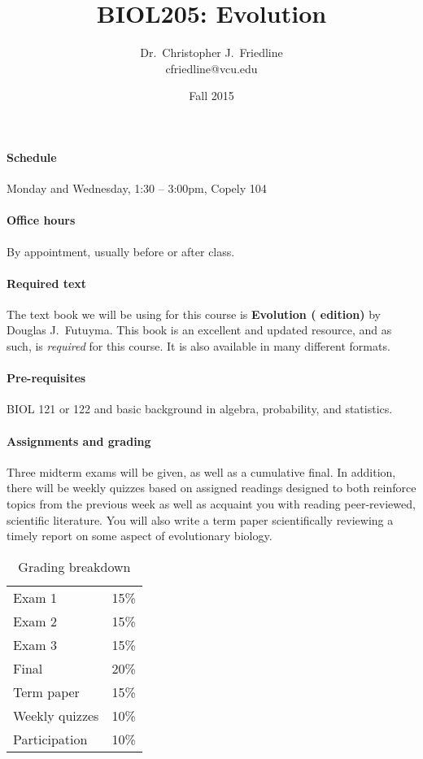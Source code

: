 \documentclass{article}
\title{BIOL205: Evolution}
\author{Dr.\ Christopher J.\ Friedline \\ cfriedline@vcu.edu}
\date{Fall 2015}
\begin{document}
\maketitle
\linespread{1.3}

\paragraph{Schedule}
Monday and Wednesday, 1:30 -- 3:00pm, Copely 104

\paragraph{Office hours}
By appointment, usually before or after class.

\paragraph{Required text}
The text book we will be using for this course is \textbf{Evolution (
edition)} by Douglas J.\ Futuyma. This book is an excellent and updated
resource,
and as such, is \textit{required} for this course. It is also available in many
different formats.

\paragraph{Pre-requisites}
BIOL 121 or 122 and basic background in algebra, probability, and statistics.

\paragraph{Assignments and grading}
Three midterm exams will be given, as well
as a cumulative final.  In addition, there will be weekly quizzes based on
assigned readings designed to both reinforce topics from the previous week as
well as acquaint you with reading peer-reviewed, scientific literature.  You
will also write a term paper scientifically reviewing a timely report on some
aspect of evolutionary biology.

\begin{table}[h]
\centering
\caption*{Grading breakdown}

\begin{tabular}{l|r}
Exam 1          &   15\% \\
Exam 2          &   15\% \\
Exam 3			& 	15\% \\
Final           &   20\% \\ 
Term paper      &   15\% \\
Weekly quizzes  &	10\% \\
Participation   &   10\% \\

\end{tabular}

\end{table}
\end{document}
